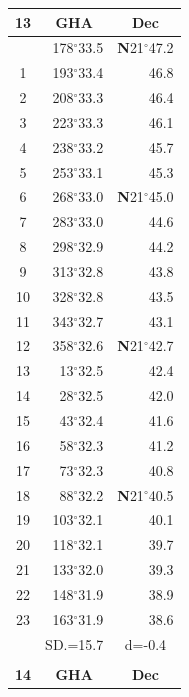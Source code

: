 \documentclass[10pt, a4paper]{report}
\begin{document}
\begin{scriptsize}
\begin{tabular*}{0.2\textwidth}[t]{@{\extracolsep{\fill}}|c|rr|}
\hline
\multicolumn{1}{|c|}{\rule{0pt}{2.6ex}\textbf{13}} & \multicolumn{1}{c}{\textbf{GHA}} & \multicolumn{1}{c|}{\textbf{Dec}}\\
\hline\rule{0pt}{2.6ex}\noindent
0 & 178$^\circ$33.5 & \textbf{N}21$^\circ$47.2\\
1 & 193$^\circ$33.4 & 46.8\\
2 & 208$^\circ$33.3 & 46.4\\
3 & 223$^\circ$33.3 & \raisebox{0.24ex}{\boldmath$\cdot$~\boldmath$\cdot$~~}46.1\\
4 & 238$^\circ$33.2 & 45.7\\
5 & 253$^\circ$33.1 & 45.3\\[2Pt]
6 & 268$^\circ$33.0 & \textbf{N}21$^\circ$45.0\\
7 & 283$^\circ$33.0 & 44.6\\
8 & 298$^\circ$32.9 & 44.2\\
9 & 313$^\circ$32.8 & \raisebox{0.24ex}{\boldmath$\cdot$~\boldmath$\cdot$~~}43.8\\
10 & 328$^\circ$32.8 & 43.5\\
11 & 343$^\circ$32.7 & 43.1\\[2Pt]
12 & 358$^\circ$32.6 & \textbf{N}21$^\circ$42.7\\
13 & 13$^\circ$32.5 & 42.4\\
14 & 28$^\circ$32.5 & 42.0\\
15 & 43$^\circ$32.4 & \raisebox{0.24ex}{\boldmath$\cdot$~\boldmath$\cdot$~~}41.6\\
16 & 58$^\circ$32.3 & 41.2\\
17 & 73$^\circ$32.3 & 40.8\\[2Pt]
18 & 88$^\circ$32.2 & \textbf{N}21$^\circ$40.5\\
19 & 103$^\circ$32.1 & 40.1\\
20 & 118$^\circ$32.1 & 39.7\\
21 & 133$^\circ$32.0 & \raisebox{0.24ex}{\boldmath$\cdot$~\boldmath$\cdot$~~}39.3\\
22 & 148$^\circ$31.9 & 38.9\\
23 & 163$^\circ$31.9 & 38.6\\
\hline
\rule{0pt}{2.4ex} & \multicolumn{1}{c}{SD.=15.7} & \multicolumn{1}{c|}{d=-0.4}\\
\hline
\multicolumn{1}{c}{}\\[-0.5ex]\hline
\multicolumn{1}{|c|}{\rule{0pt}{2.6ex}\textbf{14}} & \multicolumn{1}{c}{\textbf{GHA}} & \multicolumn{1}{c|}{\textbf{Dec}}\\

\end{tabular*}
\end{scriptsize}
\end{document}
